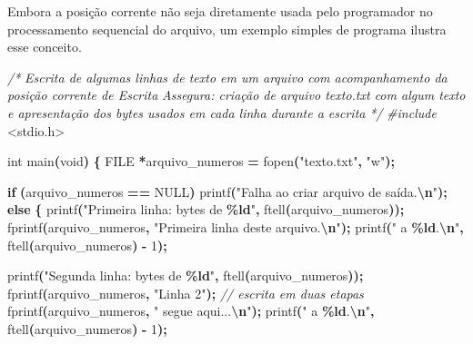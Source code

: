 \documentclass[
  11pt,
  a4paper,
]{scrbook}
\newenvironment{Shaded}{\begin{snugshade}}{\end{snugshade}}
\newcommand{\CommentTok}[1]{\textcolor[rgb]{0.56,0.35,0.01}{\textit{#1}}}
\newcommand{\ControlFlowTok}[1]{\textcolor[rgb]{0.13,0.29,0.53}{\textbf{#1}}}
\newcommand{\DataTypeTok}[1]{\textcolor[rgb]{0.13,0.29,0.53}{#1}}
\newcommand{\DecValTok}[1]{\textcolor[rgb]{0.00,0.00,0.81}{#1}}
\newcommand{\ImportTok}[1]{#1}
\newcommand{\NormalTok}[1]{#1}
\newcommand{\OperatorTok}[1]{\textcolor[rgb]{0.81,0.36,0.00}{\textbf{#1}}}
\newcommand{\PreprocessorTok}[1]{\textcolor[rgb]{0.56,0.35,0.01}{\textit{#1}}}
\newcommand{\SpecialCharTok}[1]{\textcolor[rgb]{0.81,0.36,0.00}{\textbf{#1}}}
\newcommand{\StringTok}[1]{\textcolor[rgb]{0.31,0.60,0.02}{#1}}
\begin{document}
Embora a posição corrente não seja diretamente usada pelo programador no
processamento sequencial do arquivo, um exemplo simples de programa
ilustra esse conceito.

\begin{Shaded}
\begin{Highlighting}[]
\CommentTok{/*}
\CommentTok{Escrita de algumas linhas de texto em um arquivo com acompanhamento da}
\CommentTok{    posição corrente de Escrita}
\CommentTok{Assegura: criação de arquivo \textquotesingle{}texto.txt\textquotesingle{} com algum texto e apresentação}
\CommentTok{    dos bytes usados em cada linha durante a escrita}
\CommentTok{*/}
\PreprocessorTok{\#include }\ImportTok{\textless{}stdio.h\textgreater{}}

\DataTypeTok{int}\NormalTok{ main}\OperatorTok{(}\DataTypeTok{void}\OperatorTok{)} \OperatorTok{\{}
    \DataTypeTok{FILE} \OperatorTok{*}\NormalTok{arquivo\_numeros }\OperatorTok{=}\NormalTok{ fopen}\OperatorTok{(}\StringTok{"texto.txt"}\OperatorTok{,} \StringTok{"w"}\OperatorTok{);}

    \ControlFlowTok{if} \OperatorTok{(}\NormalTok{arquivo\_numeros }\OperatorTok{==}\NormalTok{ NULL}\OperatorTok{)}
\NormalTok{        printf}\OperatorTok{(}\StringTok{"Falha ao criar arquivo de saída.}\SpecialCharTok{\textbackslash{}n}\StringTok{"}\OperatorTok{);}
    \ControlFlowTok{else} \OperatorTok{\{}
\NormalTok{        printf}\OperatorTok{(}\StringTok{"Primeira linha: bytes de }\SpecialCharTok{\%ld}\StringTok{"}\OperatorTok{,}\NormalTok{ ftell}\OperatorTok{(}\NormalTok{arquivo\_numeros}\OperatorTok{));}
\NormalTok{        fprintf}\OperatorTok{(}\NormalTok{arquivo\_numeros}\OperatorTok{,} \StringTok{"Primeira linha deste arquivo.}\SpecialCharTok{\textbackslash{}n}\StringTok{"}\OperatorTok{);}
\NormalTok{        printf}\OperatorTok{(}\StringTok{" a }\SpecialCharTok{\%ld}\StringTok{.}\SpecialCharTok{\textbackslash{}n}\StringTok{"}\OperatorTok{,}\NormalTok{ ftell}\OperatorTok{(}\NormalTok{arquivo\_numeros}\OperatorTok{)} \OperatorTok{{-}} \DecValTok{1}\OperatorTok{);}

\NormalTok{        printf}\OperatorTok{(}\StringTok{"Segunda linha: bytes de }\SpecialCharTok{\%ld}\StringTok{"}\OperatorTok{,}\NormalTok{ ftell}\OperatorTok{(}\NormalTok{arquivo\_numeros}\OperatorTok{));}
\NormalTok{        fprintf}\OperatorTok{(}\NormalTok{arquivo\_numeros}\OperatorTok{,} \StringTok{"Linha 2"}\OperatorTok{);}  \CommentTok{// escrita em duas etapas}
\NormalTok{        fprintf}\OperatorTok{(}\NormalTok{arquivo\_numeros}\OperatorTok{,} \StringTok{" segue aqui...}\SpecialCharTok{\textbackslash{}n}\StringTok{"}\OperatorTok{);}
\NormalTok{        printf}\OperatorTok{(}\StringTok{" a }\SpecialCharTok{\%ld}\StringTok{.}\SpecialCharTok{\textbackslash{}n}\StringTok{"}\OperatorTok{,}\NormalTok{ ftell}\OperatorTok{(}\NormalTok{arquivo\_numeros}\OperatorTok{)} \OperatorTok{{-}} \DecValTok{1}\OperatorTok{);}


\end{Highlighting}
\end{Shaded}
\end{document}
